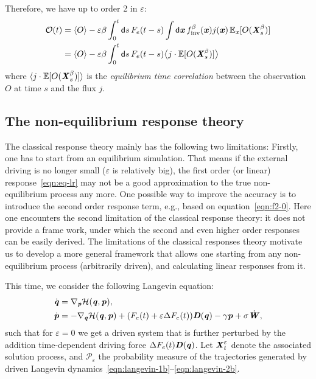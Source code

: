 \documentclass[aip,jcp,a4paper,reprint,onecolumn]{revtex4-1}
\newcommand{\vect}[1]{\textbf{\textit{#1}}}
\newcommand{\dd}{\textsf{d}}
\newcommand{\inv}{\textrm{inv}}
\newcommand{\mh}{\mathcal H}
\newcommand{\eps}{\varepsilon}
\newcommand{\ml}{\mathcal L}
\begin{document}
Therefore, we have up to order 2 in $\eps$:
\begin{align}\nonumber
  \mathcal O(t)
 & =
  \langle O\rangle
  -
  \eps\beta
  \int_0^t\dd s\,
  F_e(t-s)
  \int \dd \vect x\,
  f^\beta_{\inv}(\vect x)
  j(\vect x)\,
  \mathbb E_{\vect x} [O(\vect X^\beta_s)]\\
\label{eqn:eq-lr}  
 & =
  \langle O\rangle
  -
  \eps \beta
  \int_0^t\dd s\,
  F_e(t-s)
  \big\langle
  j\cdot
  \mathbb E [O(\vect X^\beta_s)]
  \big\rangle
\end{align}
where $  \langle
  j\cdot
  \mathbb E [O(\vect X^\beta_s)]
  \rangle$ is the \emph{equilibrium time
  correlation} between the observation $O$ at time $s$ and the flux $j$.


\subsection{The non-equilibrium response theory}

The classical response theory mainly has the following two limitations:
Firstly, one has to start from an equilibrium simulation. That means if the
external driving is no longer small ($\eps$ is relatively big), the
first order (or linear) response~\eqref{eqn:eq-lr} may not be a good approximation to
the true non-equilibrium process any more.
One possible way to improve the accuracy is to introduce the second
order response term, e.g., based on equation~\eqref{eqn:f2-0}.
Here one encounters the second limitation of the classical
response theory: it does not provide a frame work, under which
the second and even higher order responses can be easily derived.
The limitations of the classical responses theory motivate us to
develop a more general framework that allows one starting from any
non-equilibrium process (arbitrarily driven), and calculating linear responses from it.

This time, we consider the following Langevin equation:
\begin{align}\label{eqn:langevin-1b}
  \dot{\vect q} & = \nabla_{\vect p}\mh(\vect q,\vect p), \\\label{eqn:langevin-2b}
  \dot{\vect p} & =- \nabla_{\vect q}\mh(\vect q,\vect p)
  + (F_e(t)+\eps \Delta F_e(t)) \vect D(\vect q)
  - \gamma\vect p
  + \sigma\dot{\vect W},
\end{align}
such that for $\eps=0$ we get a driven system that is further
perturbed by the addition time-dependent driving force $ \Delta
F_e(t) \vect D(\vect q)$. Let $\vect X^\eps_t$ denote the associated solution process, and
$\mathcal P_\eps$ the probability measure of the trajectories
generated by driven Langevin
dynamics~\eqref{eqn:langevin-1b}--\eqref{eqn:langevin-2b}.
\end{document}
